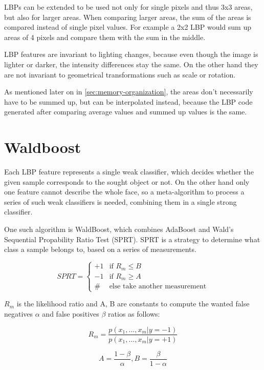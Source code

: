 LBPs can be extended to be used not only for single pixels and thus 3x3 areas, but also for larger areas. When comparing larger areas, the sum of the areas is compared instead of single pixel values. For example a 2x2 LBP would sum up areas of 4 pixels and compare them with the sum in the middle.

LBP features are invariant to lighting changes, because even though the image is lighter or darker, the intensity differences stay the same. On the other hand they are not invariant to geometrical transformations such as scale or rotation.

As mentioned later on in \ref{sec:memory-organization}, the areas don't necessarily have to be summed up, but can be interpolated instead, because the LBP code generated after comparing average values and summed up values is the same.

\section{Waldboost}
\label{sec:waldboost}

Each LBP feature represents a single weak classifier, which decides whether the given sample corresponds to the sought object or not. On the other hand only one feature cannot describe the whole face, so a meta-algorithm to process a series of such weak classifiers is needed, combining them in a single strong classifier.

One such algorithm is WaldBoost, which combines AdaBoost and Wald's Sequential Propability Ratio Test (SPRT). SPRT is a strategy to determine what class a sample belongs to, based on a series of measurements.

\[
 SPRT =
  \begin{cases}
   +1 & \text{if } R_{m} \leq B \\
   -1 & \text{if } R_{m} \geq A \\
   \# & \text{else take another measurement} 
  \end{cases}
\]

$R_{m}$ is the likelihood ratio and A, B are constants to compute the wanted false negatives $\alpha$ and false positives $\beta$ ratios as follows:

\begin{equation}
R_{m}=\frac{p(x_{1}, ..., x_{m}|y=-1)}{p(x_{1}, ..., x_{m}|y=+1)}
\end{equation}

\begin{equation}
A=\frac{1-\beta}{\alpha}, B=\frac{\beta}{1-\alpha}
\end{equation}

